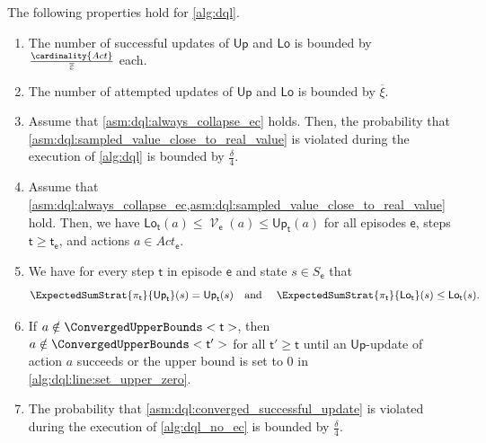 \documentclass{theoretics}
\newcommand{\States}{S}
\newcommand{\Actions}{Act}
\newcommand{\strategy}{\pi}
\DeclareMathOperator{\val}{\mathcal{V}}
\newcommand{\upperbound}{\mathsf{Up}}
\newcommand{\lowerbound}{\mathsf{Lo}}
\newcommand{\updatestep}{{\overline{\varepsilon}}}
\newcommand{\updatecount}{{\overline{\xi}}}
\newcommand{\algostep}{\mathsf{t}}
\newcommand{\algoepisode}{\mathsf{e}}
\begin{document}
\begin{lemma} \label{stm:dql:properties}
	The following properties hold for \cref{alg:dql}.
	\begin{enumerate}
		\item \label{item:stm:dql:properties:success_updates}
		The number of successful updates of $\upperbound$ and $\lowerbound$ is bounded by $\frac{\cardinality{\Actions}}{\updatestep}$ each.

		\item \label{item:stm:dql:properties:attempted_updates}
		The number of attempted updates of $\upperbound$ and $\lowerbound$ is bounded by $\updatecount$.

		\item \label{item:stm:dql:properties:sampled_value_close_to_real_value_probability}
		Assume that \cref{asm:dql:always_collapse_ec} holds.
		Then, the probability that \cref{asm:dql:sampled_value_close_to_real_value} is violated during the execution of \cref{alg:dql} is bounded by $\frac{\delta}{4}$.

		\item \label{item:stm:dql:properties:bounds_ordered}
		Assume that \cref{asm:dql:always_collapse_ec,asm:dql:sampled_value_close_to_real_value} hold.
		Then, we have $\lowerbound_\algostep(a) \leq \val_\algoepisode(a) \leq \upperbound_\algostep(a)$ for all episodes $\algoepisode$, steps $\algostep \geq \algostep_\algoepisode$, and actions $a \in \Actions_\algoepisode$.

		\item \label{item:stm:dql:properties:strategy_bounds}
		We have for every step $\algostep$ in episode $\algoepisode$ and state $s \in \States_\algoepisode$ that
		\begin{equation*}
			\ExpectedSumStrat{\strategy_\algostep}{\upperbound_\algostep}(s) = \upperbound_\algostep(s) \text{\quad and \quad} \ExpectedSumStrat{\strategy_\algostep}{\lowerbound_\algostep}(s) \leq \lowerbound_\algostep(s).
		\end{equation*}

		\item \label{item:stm:dql:properties:update_succeeds}
		If $a \notin \ConvergedUpperBounds<\algostep>$, then $a \notin \ConvergedUpperBounds<\algostep'>$ for all $\algostep' \geq \algostep$ until an $\upperbound$-update of action $a$ succeeds or the upper bound is set to $0$ in \cref{alg:dql:line:set_upper_zero}.

		\item \label{item:stm:dql:properties:converged_successful_update_probability}
		The probability that \cref{asm:dql:converged_successful_update} is violated during the execution of \cref{alg:dql_no_ec} is bounded by $\frac{\delta}{4}$.


\end{enumerate}
\end{lemma}
\end{document}
